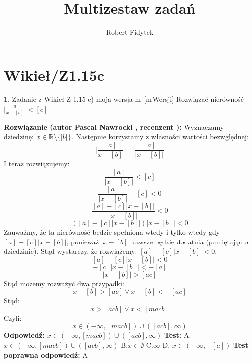 \documentclass[12pt, a4paper]{article}
\title{Multizestaw zadań}
\author{Robert Fidytek}
\date{}
\theoremstyle{definition} %
\newtheorem{zad}{}
\newcommand{\kategoria}[1]{\section{#1}} %
\newcommand{\zadStart}[1]{\begin{zad}#1\newline} %
\newcommand{\zadStop}{\end{zad}}   %
\newcommand{\rozwStart}[2]{\noindent \textbf{Rozwiązanie (autor #1 , recenzent #2): }\newline} %
\newcommand{\odpStart}{\noindent \textbf{Odpowiedź:}\newline}    %
\newcommand{\odpStop}{\newline}                                             %
\newcommand{\testStart}{\noindent \textbf{Test:}\newline} %
\newcommand{\testStop}{\newline} %
\newcommand{\kluczStart}{\noindent \textbf{Test poprawna odpowiedź:}\newline} %
\newcommand{\kluczStop}{\newline} %
\begin{document}
\maketitle



\kategoria{Wikieł/Z1.15c}
\zadStart{Zadanie z Wikieł Z 1.15 c) moja wersja nr [nrWersji]}
Rozwiązać nierówność $\big|\frac{[a]}{x-[b]}\big|<[c]$
\zadStop
\rozwStart{Pascal Nawrocki}{}
Wyznaczamy dziedzinę: $x\in\mathbb{R}\symbol{92}\{[b]\}$.
Następnie korzystamy z własności wartości bezwględnej:
$$\bigg|\frac{[a]}{x-[b]}\bigg|=\frac{[a]}{|x-[b]|}$$
I teraz rozwiązujemy:
$$\frac{[a]}{|x-[b]|}<[c]$$
$$\frac{[a]}{|x-[b]|}-[c]<0$$
$$\frac{[a]-[c]|x-[b]|}{|x-[b]|}<0$$
$$([a]-[c]|x-[b]|)|x-[b]|<0$$
Zauważmy, że ta nierówność będzie spełniona wtedy i tylko wtedy gdy $[a]-[c]|x-[b]|$, ponieważ $|x-[b]|$ zawsze będzie dodatnia (pamiętając o dziedzinie). Stąd wystarczy, że rozwiążemy: $[a]-[c]|x-[b]|<0$.
$$[a]-[c]|x-[b]|<0$$
$$-[c]|x-[b]|<-[a]$$
$$|x-[b]|>[ac]$$
Stąd możemy rozważyć dwa przypadki:
$$x-[b]>[ac] \vee x-[b]<-[ac]$$
Stąd:
$$x>[acb] \vee x<[macb]$$
Czyli:
$$x\in(-\infty,[macb])\cup([acb],\infty)$$
\odpStart
$x\in(-\infty,[macb])\cup([acb],\infty)$
\odpStop
\testStart
A.$x\in(-\infty,[macb])\cup([acb],\infty)$
B.$x\in \emptyset$
C.$\infty$
D. $x\in (-\infty,-[a])$
\testStop
\kluczStart
A
\kluczStop
\end{document}

